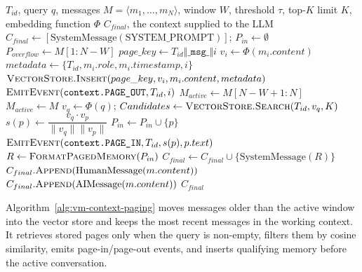 \begin{algorithm}[H]
\caption{Virtual Memory Context Paging}
\label{alg:vm-context-paging}
\begin{algorithmic}[1]
\Require $T_{id}$, query $q$, messages $M=\langle m_1,\ldots,m_N\rangle$, window $W$, threshold $\tau$, top-$K$ limit $K$, embedding function $\Phi$
\Ensure $C_{final}$, the context supplied to the LLM
\State $C_{final} \gets [\text{SystemMessage}(\text{SYSTEM\_PROMPT})]$; $P_{in} \gets \emptyset$
    \State $P_{overflow} \gets M[1:N-W]$
        \State $page\_key \gets T_{id}\Vert\texttt{\_msg\_}\Vert i$
            \State $v_i \gets \Phi(m_i.content)$
            \State $metadata \gets \{T_{id},m_i.role,m_i.timestamp,i\}$
            \State $\Call{VectorStore.Insert}{page\_key,v_i,m_i.content,metadata}$
            \State $\Call{EmitEvent}{\texttt{context.PAGE\_OUT},T_{id},i}$
        \EndIf
    \EndFor
    \State $M_{active} \gets M[N-W+1:N]$
\Else
    \State $M_{active} \gets M$
\EndIf
{}
    \State $v_q \gets \Phi(q)$; $Candidates \gets \Call{VectorStore.Search}{T_{id},v_q,K}$
        \State $s(p) \gets \dfrac{v_q\cdot v_p}{\lVert v_q\rVert\lVert v_p\rVert}$
            \State $P_{in} \gets P_{in}\cup\{p\}$
            \State $\Call{EmitEvent}{\texttt{context.PAGE\_IN},T_{id},s(p),p.text}$
        \EndIf
    \EndFor
\EndIf
{}
    \State $R\gets\Call{FormatPagedMemory}{P_{in}}$
    \State $C_{final}\gets C_{final}\cup\{\text{SystemMessage}(R)\}$
\EndIf
{}
        \State $C_{final}.\Call{Append}{\text{HumanMessage}(m.content)}$
        \State $C_{final}.\Call{Append}{\text{AIMessage}(m.content)}$
    \EndIf
\EndFor
\State \Return $C_{final}$
\end{algorithmic}
\end{algorithm}
Algorithm~\ref{alg:vm-context-paging} moves messages older than the active window into the vector store and keeps the most recent messages in the working context. It retrieves stored pages only when the query is non-empty, filters them by cosine similarity, emits page-in/page-out events, and inserts qualifying memory before the active conversation.
\vspace{\baselineskip}
